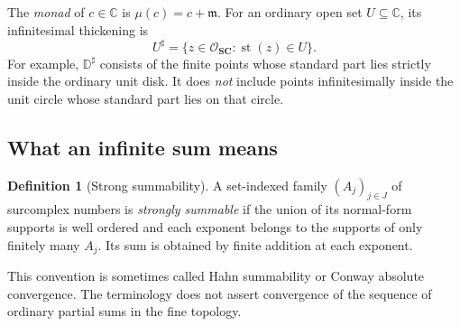 \documentclass[11pt,letterpaper]{article}
\theoremstyle{definition}
\newtheorem{definition}[theorem]{Definition}
\theoremstyle{remark}
\newcommand{\SC}{\mathbf{SC}}
\newcommand{\C}{\mathbb C}
\newcommand{\OO}{\mathcal O}
\newcommand{\mm}{\mathfrak m}
\newcommand{\DD}{\mathbb D}
\newcommand{\st}{\operatorname{st}}
\newcommand{\sh}{^{\sharp}}
\numberwithin{equation}{section}
\begin{document}
The \emph{monad} of $c\in\C$ is $\mu(c)=c+\mm$. For an ordinary open set $U\subseteq\C$, its infinitesimal thickening is
\begin{equation}\label{eq:tube}
 U\sh=\{z\in\OO_{\SC}:\st(z)\in U\}.
\end{equation}
For example, $\DD\sh$ consists of the finite points whose standard part lies strictly inside the ordinary unit disk. It does \emph{not} include points infinitesimally inside the unit circle whose standard part lies on that circle.

\subsection{What an infinite sum means}
\begin{definition}[Strong summability]\label{def:strong}
A set-indexed family $(A_j)_{j\in J}$ of surcomplex numbers is \emph{strongly summable} if the union of its normal-form supports is well ordered and each exponent belongs to the supports of only finitely many $A_j$. Its sum is obtained by finite addition at each exponent.
\end{definition}
This convention is sometimes called Hahn summability or Conway absolute convergence. The terminology does not assert convergence of the sequence of ordinary partial sums in the fine topology.
\end{document}
